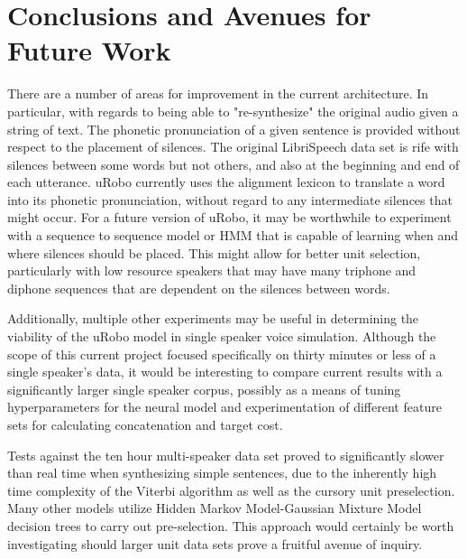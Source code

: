 \documentclass[10pt, journal, compsoc]{IEEEtran}
\begin{document}
\section{Conclusions and Avenues for Future Work}
There are a number of areas for improvement in the current architecture. In particular, with regards to being able to "re-synthesize" the original audio given a string of text. The phonetic pronunciation of a given sentence is provided without respect to the placement of silences. The original LibriSpeech data set is rife with silences between some words but not others, and also at the beginning and end of each utterance. uRobo currently uses the alignment lexicon to translate a word into its phonetic pronunciation, without regard to any intermediate silences that might occur. For a future version of uRobo, it may be worthwhile to experiment with a sequence to sequence model or HMM that is capable of learning when and where silences should be placed. This might allow for better unit selection, particularly with low resource speakers that may have many triphone and diphone sequences that are dependent on the silences between words.\par
Additionally, multiple other experiments may be useful in determining the viability of the uRobo model in single speaker voice simulation. Although the scope of this current project focused specifically on thirty minutes or less of a single speaker's data, it would be interesting to compare current results with a significantly larger single speaker corpus, possibly as a means of tuning hyperparameters for the neural model and experimentation of different feature sets for calculating concatenation and target cost.\par
Tests against the ten hour multi-speaker data set proved to significantly slower than real time when synthesizing simple sentences, due to the inherently high time complexity of the Viterbi algorithm as well as the cursory unit preselection. Many other models utilize Hidden Markov Model-Gaussian Mixture Model decision trees to carry out pre-selection.\cite{45564} This approach would certainly be worth investigating should larger unit data sets prove a fruitful avenue of inquiry.

\newpage

\end{document}
